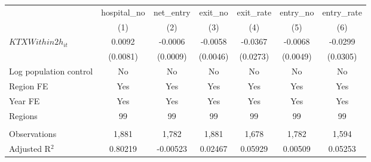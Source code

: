 \begingroup
\centering
\begin{tabular}{lcccccc}
   \toprule
                          & hospital\_no  & net\_entry  & exit\_no  & exit\_rate  & entry\_no  & entry\_rate \\    
                          & (1)           & (2)         & (3)       & (4)         & (5)        & (6)\\  
   \midrule 
   $KTXWithin2h_{it}$     & 0.0092        & -0.0006     & -0.0058   & -0.0367     & -0.0068    & -0.0299\\   
                          & (0.0081)      & (0.0009)    & (0.0046)  & (0.0273)    & (0.0049)   & (0.0305)\\   
   Log population control & No            & No          & No        & No          & No         & No\\  
   Region FE              & Yes           & Yes         & Yes       & Yes         & Yes        & Yes\\  
   Year FE                & Yes           & Yes         & Yes       & Yes         & Yes        & Yes\\  
   Regions                & 99            & 99          & 99        & 99          & 99         & 99\\  
    \\
   Observations           & 1,881         & 1,782       & 1,881     & 1,678       & 1,782      & 1,594\\  
   Adjusted R$^2$         & 0.80219       & -0.00523    & 0.02467   & 0.05929     & 0.00509    & 0.05253\\  
   \bottomrule
\end{tabular}
\par\endgroup
